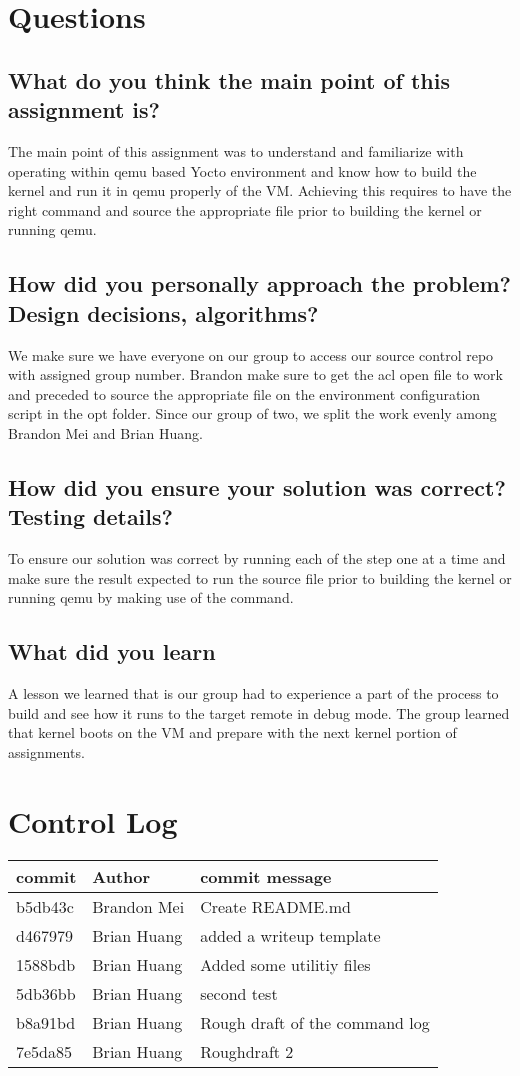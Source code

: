 \documentclass[onecolumn, draftclsnofoot, 10pt, titlepage, compsoc]{IEEEtran}
\begin{document}
\section*{Questions}
\subsection*{What do you think the main point of this assignment is?}
The main point of this assignment was to understand and familiarize with operating within qemu based Yocto environment and know how to build the kernel and run it in qemu properly of the VM. Achieving this requires to have the right command and source the appropriate file prior to building the kernel or running qemu. 
\subsection*{How did you personally approach the problem? Design decisions, algorithms?}
We make sure we have everyone on our group to access our source control repo with assigned group number. Brandon make sure to get the acl open file to work and preceded to source the appropriate file on the environment configuration script in the opt folder. Since our group of two, we split the work evenly among Brandon Mei and Brian Huang. 
\subsection*{How did you ensure your solution was correct? Testing details?}
To ensure our solution was correct by running each of the step one at a time and make sure the result expected to run the source file prior to building the kernel or running qemu by making use of the command. 
\subsection*{What did you learn}
A lesson we learned that is our group had to experience a part of the process to build and see how it runs to the target remote in debug mode. The group learned that kernel boots on the VM and prepare with the next kernel portion of assignments. 

\section*{Control Log}
\begin{tabular}{ | p{5cm} | p{5cm} | p{5cm} | }
	\hline
	commit & Author & commit message \\
	\hline
	\hline
	b5db43c & Brandon Mei & Create README.md \\
	\hline
	d467979 & Brian Huang & added a writeup template \\
	\hline
	1588bdb & Brian Huang & Added some utilitiy files \\
	\hline
	5db36bb & Brian Huang & second test \\
	\hline
	b8a91bd & Brian Huang & Rough draft of the command log \\
	\hline
	7e5da85 & Brian Huang & Roughdraft 2\\
	\hline
\end{tabular}
\end{document}
